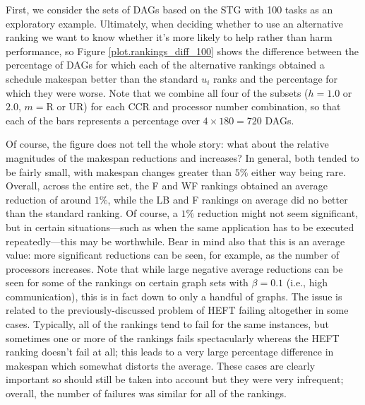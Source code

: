 \documentclass[12pt]{article}
\begin{document}
First, we consider the sets of DAGs based on the STG with 100 tasks as an exploratory example. Ultimately, when deciding whether to use an alternative ranking we want to know whether it's more likely to help rather than harm performance, so Figure \ref{plot.rankings_diff_100} shows the difference between the percentage of DAGs for which each of the alternative rankings obtained a schedule makespan better than the standard $u_i$ ranks and the percentage for which they were worse. Note that we combine all four of the subsets ($h = 1.0$ or $2.0$, $m = \text{R}$ or UR) for each CCR and processor number combination, so that each of the bars represents a percentage over $4 \times 180 = 720$ DAGs.

Of course, the figure does not tell the whole story: what about the relative magnitudes of the makespan reductions and increases? In general, both tended to be fairly small, with makespan changes greater than $5\%$ either way being rare. Overall, across the entire set, the F and WF rankings obtained an average reduction of around $1\%$, while the LB and F rankings on average did no better than the standard ranking. Of course, a $1\%$ reduction might not seem significant, but in certain situations---such as when the same application has to be executed repeatedly---this may be worthwhile. Bear in mind also that this is an average value: more significant reductions can be seen, for example, as the number of processors increases. Note that while large negative average reductions can be seen for some of the rankings on certain graph sets with $\beta = 0.1$ (i.e., high communication), this is in fact down to only a handful of graphs. The issue is related to the previously-discussed problem of HEFT failing altogether in some cases. Typically, all of the rankings tend to fail for the same instances, but sometimes one or more of the rankings fails spectacularly whereas the HEFT ranking doesn't fail at all; this leads to a very large percentage difference in makespan which somewhat distorts the average. These cases are clearly important so should still be taken into account but they were very infrequent; overall, the number of failures was similar for all of the rankings.   
\end{document}
